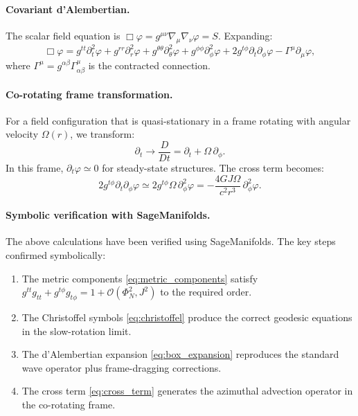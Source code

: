\documentclass[11pt]{article}
\begin{document}
\paragraph{Covariant d'Alembertian.}
The scalar field equation is $\Box\varphi = g^{\mu\nu}\nabla_\mu\nabla_\nu\varphi = S$. Expanding:
\begin{equation}
\Box\varphi = g^{tt}\partial_t^2\varphi + g^{rr}\partial_r^2\varphi + g^{\theta\theta}\partial_\theta^2\varphi + g^{\phi\phi}\partial_\phi^2\varphi + 2g^{t\phi}\partial_t\partial_\phi\varphi - \Gamma^\mu\partial_\mu\varphi,
\label{eq:box_expansion}
\end{equation}
where $\Gamma^\mu = g^{\alpha\beta}\Gamma^\mu_{\alpha\beta}$ is the contracted connection.

\paragraph{Co-rotating frame transformation.}
For a field configuration that is quasi-stationary in a frame rotating with angular velocity $\Omega(r)$, we transform:
\begin{equation}
\partial_t \rightarrow \frac{D}{Dt} = \partial_t + \Omega\,\partial_\phi.
\label{eq:corotating_transform}
\end{equation}
In this frame, $\partial_t \varphi \simeq 0$ for steady-state structures. The cross term becomes:
\begin{equation}
2g^{t\phi}\partial_t\partial_\phi\varphi \simeq 2g^{t\phi}\Omega\,\partial_\phi^2\varphi = -\frac{4GJ\Omega}{c^2r^3}\,\partial_\phi^2\varphi.
\label{eq:cross_term}
\end{equation}

\paragraph{Symbolic verification with SageManifolds.}
The above calculations have been verified using SageManifolds.
The key steps confirmed symbolically:
\begin{enumerate}
\item The metric components \eqref{eq:metric_components} satisfy $g^{tt}g_{tt} + g^{t\phi}g_{t\phi} = 1 + \mathcal{O}(\Phi_N^2, J^2)$ to the required order.
\item The Christoffel symbols \eqref{eq:christoffel} produce the correct geodesic equations in the slow-rotation limit.
\item The d'Alembertian expansion \eqref{eq:box_expansion} reproduces the standard wave operator plus frame-dragging corrections.
\item The cross term \eqref{eq:cross_term} generates the azimuthal advection operator in the co-rotating frame.
\end{enumerate}
\end{document}
